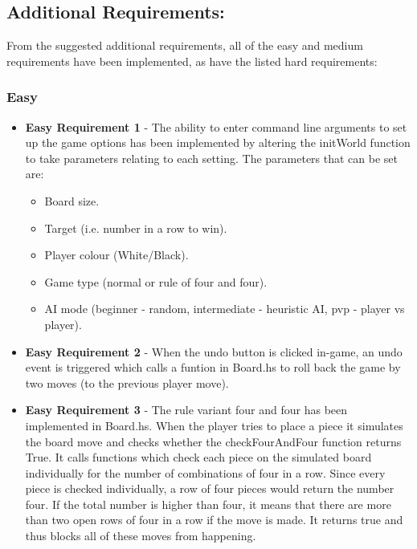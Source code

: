 \documentclass[11]{article}
\begin{document}
	\subsection{Additional Requirements:}
	 From the suggested additional requirements, all of the easy and medium requirements have been implemented, as have the listed hard requirements:
	 	\subsubsection{Easy}
			\begin{itemize}
				\item \textbf{Easy Requirement 1} - The ability to enter command line arguments to set up the game options has been implemented by altering the initWorld function to take parameters relating to each setting. The parameters that can be set are:
					\begin{itemize}
						\item Board size.
						\item Target (i.e. number in a row to win).
						\item Player colour (White/Black).
						\item Game type (normal or rule of four and four).
						\item AI mode (beginner - random, intermediate - heuristic AI, pvp - player vs player).
					\end{itemize}
				\item \textbf{Easy Requirement 2} - When the undo button is clicked in-game, an undo event is triggered which calls a funtion in Board.hs to roll back the game by two moves (to the previous player move).
				\item \textbf{Easy Requirement 3} - The rule variant four and four has been implemented in Board.hs. When the player tries to place a piece it simulates the board move and checks whether the checkFourAndFour function returns True. It calls functions which check each piece on the simulated board individually for the number of combinations of four in a row. Since every piece is checked individually, a row of four pieces would return the number four. If the total number is higher than four, it means that there are more than two open rows of four in a row if the move is made. It returns true and thus blocks all of these moves from happening. 
			\end{itemize}
\end{document}
